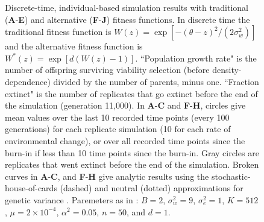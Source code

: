\documentclass[12pt,letterpaper]{article} %
\begin{document}
\begin{figure}[!ht]
\centering
%
\caption{
Discrete-time, individual-based simulation results with traditional (\textbf{A}-\textbf{E}) and alternative (\textbf{F}-\textbf{J}) fitness functions.
In discrete time the traditional fitness function is $W(z) = \exp\left[ -(\theta - z)^2 / (2\sigma_w^2) \right]$ \citep[][equation 1]{Burger1995} and the alternative fitness function is $W^*(z) = \exp\left[ d(W(z) - 1)\right]$.
``Population growth rate" is the number of offspring surviving viability selection (before density-dependence) divided by the number of parents, minus one. 
``Fraction extinct" is the number of replicates that go extinct before the end of the simulation (generation 11,000).
In \textbf{A}-\textbf{C} and \textbf{F}-\textbf{H}, circles give mean values over the last 10 recorded time points (every 100 generations) for each replicate simulation (10 for each rate of environmental change), or over all recorded time points since the burn-in if less than 10 time points since the burn-in.
Gray circles are replicates that went extinct before the end of the simulation.  
Broken curves in \textbf{A}-\textbf{C}, and \textbf{F}-\textbf{H} give analytic results using the stochastic-house-of-cards (dashed) and neutral (dotted) approximations for genetic variance \citep[equations 14 and 15 in][]{Burger1995}.
Paremeters as in \cite{Burger1995}: $B = 2$, $\sigma_w^2 = 9$, $\sigma_e^2 = 1$, $K=512$, $\mu = 2\times10^{-4}$, $\alpha^2 = 0.05$, $n=50$, and $d=1$.
}
\label{ModerateSummaryLast}
\end{figure}
\end{document}
